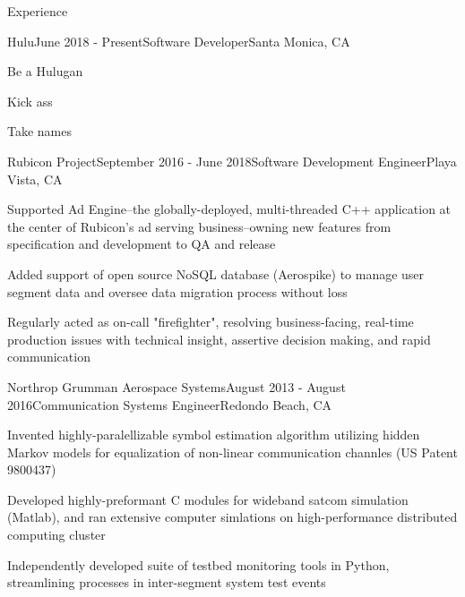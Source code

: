\documentclass{resume} %
\begin{document}
\begin{rSection}{Experience}

\begin{rSubsection}{Hulu}{June 2018 - Present}{Software Developer}{Santa Monica, CA}
\item Be a Hulugan
\item Kick ass
\item Take names
\end{rSubsection}

\begin{rSubsection}{Rubicon Project}{September 2016 - June 2018}{Software Development Engineer}{Playa Vista, CA}
\item Supported Ad Engine--the globally-deployed, multi-threaded C++ application at the center of Rubicon's ad serving business--owning new features from specification and development to QA and release
\item Added support of open source NoSQL database (Aerospike) to manage user segment data and oversee data migration process without loss
\item Regularly acted as on-call "firefighter", resolving business-facing, real-time production issues with technical insight, assertive decision making, and rapid communication
\end{rSubsection}

\begin{rSubsection}{Northrop Grumman Aerospace Systems}{August 2013 - August 2016}{Communication Systems Engineer}{Redondo Beach, CA}
\item Invented highly-paralellizable symbol estimation algorithm utilizing hidden Markov models for equalization of non-linear communication channles (US Patent 9800437)
\item Developed highly-preformant C modules for wideband satcom simulation (Matlab), and ran extensive computer simlations on high-performance distributed computing cluster
\item Independently developed suite of testbed monitoring tools in Python, streamlining processes in inter-segment system test events
\end{rSubsection}


\end{rSection}
\end{document}
